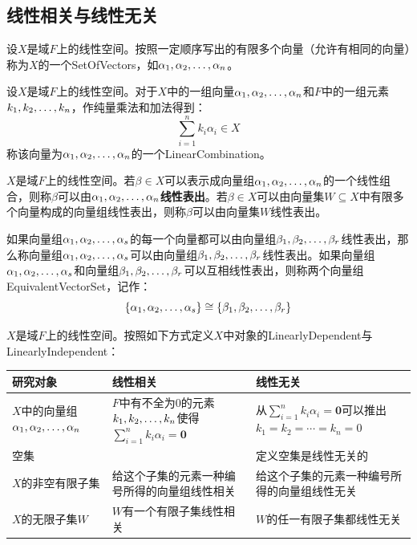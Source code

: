 \subsection{线性相关与线性无关}
\begin{definition}
	设$X$是域$F$上的线性空间。按照一定顺序写出的有限多个向量（允许有相同的向量）称为$X$的一个\gls{SetOfVectors}，如$\alpha_1, \alpha_2, \dots, \alpha_{n}$。
\end{definition}
\begin{definition}
	设$X$是域$F$上的线性空间。对于$X$中的一组向量$\alpha_1, \alpha_2, \dots, \alpha_{n}$和$F$中的一组元素$k_1, k_2, \dots, k_{n}$，作纯量乘法和加法得到：
	\begin{equation*}
		\sum_{i=1}^{n}k_i\alpha_i\in X
	\end{equation*}
	称该向量为$\alpha_1, \alpha_2, \dots, \alpha_{n}$的一个\gls{LinearCombination}。
\end{definition}
\begin{definition}
	$X$是域$F$上的线性空间。若$\beta\in X$可以表示成向量组$\alpha_1, \alpha_2, \dots, \alpha_{n}$的一个线性组合，则称$\beta$可以由$\alpha_1, \alpha_2, \dots, \alpha_{n}$\textbf{线性表出}。若$\beta\in X$可以由向量集$W\subseteq X$中有限多个向量构成的向量组线性表出，则称$\beta$可以由向量集$W$线性表出。
\end{definition}
\begin{definition}
	如果向量组$\alpha_1, \alpha_2, \dots, \alpha_{s}$的每一个向量都可以由向量组$\beta_1, \beta_2, \dots, \beta_{r}$线性表出，那么称向量组$\alpha_1, \alpha_2, \dots, \alpha_{s}$可以由向量组$\beta_1, \beta_2, \dots, \beta_{r}$线性表出。如果向量组$\alpha_1, \alpha_2, \dots, \alpha_{s}$和向量组$\beta_1, \beta_2, \dots, \beta_{r}$可以互相线性表出，则称两个向量组\gls{EquivalentVectorSet}，记作：
	\begin{equation*}
		\{\alpha_1, \alpha_2, \dots, \alpha_{s}\}\cong\{\beta_1, \beta_2, \dots, \beta_{r}\}
	\end{equation*}
\end{definition}
\begin{definition}
	$X$是域$F$上的线性空间。按照如下方式定义$X$中对象的\gls{LinearlyDependent}与\gls{LinearlyIndependent}：
	\begin{table}[H]
		\centering
		\begin{tabular}{>{\centering\arraybackslash}p{4cm}|>{\centering\arraybackslash}p{5cm}|>{\centering\arraybackslash}p{6cm}}
			\toprule
			\textbf{研究对象} & \textbf{线性相关} & \textbf{线性无关} \\
			\midrule
			$X$中的向量组$\alpha_1, \alpha_2, \dots, \alpha_{n}$ & $F$中有不全为$0$的元素$k_1, k_2, \dots, k_{n}$使得$\sum\limits_{i=1}^{n}k_i\alpha_i=\mathbf{0}$ & 从$\sum\limits_{i=1}^{n}k_i\alpha_i=\mathbf{0}$可以推出$k_1=k_2=\cdots=k_n=0$ \\
			\hline
			空集 & & 定义空集是线性无关的\\
			\hline
			$X$的非空有限子集 & 给这个子集的元素一种编号所得的向量组线性相关 & 给这个子集的元素一种编号所得的向量组线性无关 \\
			\hline
			$X$的无限子集$W$ & $W$有一个有限子集线性相关 & $W$的任一有限子集都线性无关 \\
			\bottomrule
		\end{tabular}
	\end{table}
\end{definition}
